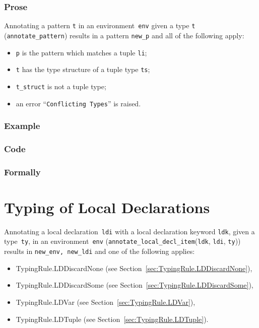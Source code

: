 \documentclass{book}
\newcommand\annotatelocaldeclitem[1]{\texttt{annotate\_local\_decl\_item}(#1)}
\newcommand\ldi[0]{\texttt{ldi}}
\newcommand\ldk[0]{\texttt{ldk}}
\newcommand\tty[0]{\texttt{ty}}
\begin{document}
  \subsection{Prose}
   Annotating a pattern \texttt{t} in an environment~\texttt{env} given a type \texttt{t} (\texttt{annotate\_pattern}) results in a pattern \texttt{new\_p} and all of the following apply:
   \begin{itemize}
   \item \texttt{p} is the pattern which matches a tuple \texttt{li};
   \item \texttt{t} has the type structure of a tuple type \texttt{ts};
   \item \texttt{t\_struct} is not a tuple type;
   \item an error ``\texttt{Conflicting Types}'' is raised.
   \end{itemize}

  \subsection{Example}

  \subsection{Code}

\begin{emptyformal}
    \subsection{Formally}
\end{emptyformal}


\chapter{Typing of Local Declarations}

Annotating a local declaration~\texttt{ldi} with a local declaration keyword \texttt{ldk}, given a type~\texttt{ty}, in an
environment~\texttt{env} (\annotatelocaldeclitem{\ldk, \ldi, \tty}) results in \texttt{new\_env, new\_ldi} and one of the following applies:
\begin{itemize}
\item TypingRule.LDDiscardNone (see Section~\ref{sec:TypingRule.LDDiscardNone}),
\item TypingRule.LDDiscardSome (see Section~\ref{sec:TypingRule.LDDiscardSome}),
\item TypingRule.LDVar (see Section~\ref{sec:TypingRule.LDVar}),
\item TypingRule.LDTuple (see Section~\ref{sec:TypingRule.LDTuple}).
\end{itemize}
\end{document}
